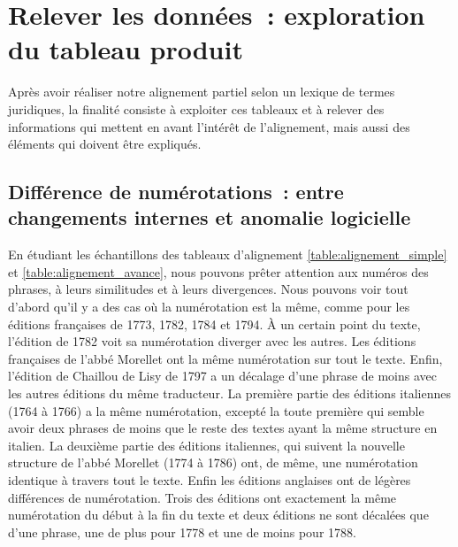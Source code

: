 \begin{landscape}
\pagestyle{empty}


\end{landscape}

\section{Relever les données~: exploration du tableau produit}
Après avoir réaliser notre alignement partiel selon un lexique de termes juridiques, la finalité consiste à exploiter ces tableaux et à relever des informations qui mettent en avant l’intérêt de l’alignement, mais aussi des éléments qui doivent être expliqués.

\subsection{Différence de numérotations~: entre changements internes et anomalie logicielle}
En étudiant les échantillons des tableaux d’alignement \ref{table:alignement_simple} et \ref{table:alignement_avance}, nous pouvons prêter attention aux numéros des phrases, à leurs similitudes et à leurs divergences. Nous pouvons voir tout d’abord qu’il y a des cas où la numérotation est la même, comme pour les éditions françaises de 1773, 1782, 1784 et 1794. À un certain point du texte, l’édition de 1782 voit sa numérotation diverger avec les autres. Les éditions françaises de l’abbé Morellet ont la même numérotation sur tout le texte. Enfin, l’édition de Chaillou de Lisy de 1797 a un décalage d’une phrase de moins avec les autres éditions du même traducteur. La première partie des éditions italiennes (1764 à 1766) a la même numérotation, excepté la toute première qui semble avoir deux phrases de moins que le reste des textes ayant la même structure en italien. La deuxième partie des éditions italiennes, qui suivent la nouvelle structure de l’abbé Morellet (1774 à 1786) ont, de même, une numérotation identique à travers tout le texte. Enfin les éditions anglaises ont de légères différences de numérotation. Trois des éditions ont exactement la même numérotation du début à la fin du texte et deux éditions ne sont décalées que d’une phrase, une de plus pour 1778 et une de moins pour 1788. 

